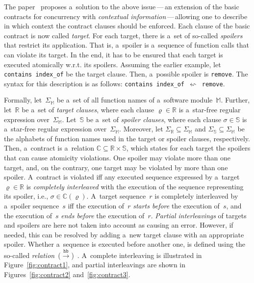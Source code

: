 The paper~\cite{contracts2017} proposes a~solution to the above issue\,---\,an extension of the basic contracts for concurrency with \emph{contextual information}\,---\,allowing one to describe in which context the contract clauses should be enforced. Each clause of the basic contract is now called \emph{target}. For each target, there is a~set of so-called \emph{spoilers} that restrict its application. That is, a~spoiler is a~sequence of function calls that can violate its target. In the end, it has to be ensured that each target is executed atomically w.r.t. its spoilers. Assuming the earlier example, let \texttt{contains index\_of} be the target clause. Then, a~possible spoiler is \texttt{remove}. The syntax for this description is as follows: \texttt{contains index\_of}\ $ \leftsquigarrow $\ \texttt{remove}.

Formally, let~$ \Sigma_\mathbb{M} $ be a~set of all function names of a~software module~$ \mathbb{M} $. Further, let~$ \mathbb{R} $ be a~set of \emph{target clauses}, where each clause $ \varrho \in \mathbb{R} $ is a~star-free regular expression over~$ \Sigma_\mathbb{M} $. Let~$ \mathbb{S} $ be a~set of \emph{spoiler clauses}, where each clause $ \sigma \in \mathbb{S} $ is a~star-free regular expression over~$ \Sigma_\mathbb{M} $. Moreover, let $ \Sigma_\mathbb{R} \subseteq \Sigma_\mathbb{M} $ and $ \Sigma_\mathbb{S} \subseteq \Sigma_\mathbb{M} $ be the alphabets of function names used in the target or spoiler clauses, respectively. Then, a~contract is a~relation $ \mathbb{C} \subseteq \mathbb{R} \times \mathbb{S} $, which states for each target the spoilers that can cause atomicity violations. One spoiler may violate more than one target, and, on the contrary, one target may be violated by more than one spoiler. A~contract is violated iff any executed sequence expressed by a~target $ \varrho \in \mathbb{R} $ is \emph{completely interleaved} with the execution of the sequence representing its spoiler, i.e., $ \sigma \in \mathbb{C}(\varrho) $. A~target sequence~$ r $ is completely interleaved by a~spoiler sequence~$ s $ iff the execution of~$ r $ \emph{starts before} the execution of~$ s $, and the execution of~$ s $ \emph{ends before} the execution of~$ r $. \emph{Partial interleavings} of targets and spoilers are here not taken into account as causing an error. However, if needed, this can be resolved by adding a~new target clause with an appropriate spoiler. Whether a~sequence is executed before another one, is defined using the so-called \emph{ relation}~($ \xrightarrow{\mathtt{hb}} $)~\cite{lamportHb}. A~complete interleaving is illustrated in Figure~\ref{fig:contract1}, and partial interleavings are shown in Figures~\ref{fig:contract2} and~\ref{fig:contract3}.

